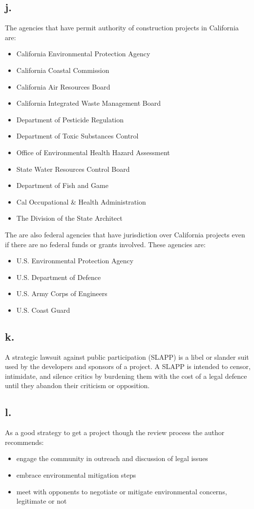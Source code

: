 \documentclass[12pt]{article}
\renewcommand{\=}[1]{\stackrel{#1}{=}} %
\theoremstyle{definition}
\theoremstyle{remark}
\begin{document}
\subsection{j.}
The agencies that have permit authority of construction projects in California are:
\begin{itemize}
	\item California Environmental Protection Agency
	\item California Coastal Commission
	\item California Air Resources Board
	\item California Integrated Waste Management Board
	\item Department of Pesticide Regulation
	\item Department of Toxic Substances Control
	\item Office of Environmental Health Hazard Assessment
	\item State Water Resources Control Board
	\item Department of Fish and Game
	\item Cal Occupational \& Health Administration
	\item The Division of the State Architect
\end{itemize}

The are also federal agencies that have jurisdiction over California projects even if there are no federal funds or grants involved. These agencies are:
\begin{itemize}
	\item U.S. Environmental Protection Agency
	\item U.S. Department of Defence
	\item U.S. Army Corps of Engineers
	\item U.S. Coast Guard
\end{itemize}

\subsection{k.}
A strategic lawsuit against public participation (SLAPP) is a libel or slander suit used by the developers and sponsors of a project. A SLAPP is intended to censor, intimidate, and silence critics by burdening them with the cost of a legal defence until they abandon their criticism or opposition.

\subsection{l.}
As a good strategy to get a project though the review process the author recommends:
\begin{itemize}
	\item engage the community in outreach and discussion of legal issues
	\item embrace environmental mitigation steps
	\item meet with opponents to negotiate or mitigate environmental concerns, legitimate or not
\end{itemize}
\end{document}
